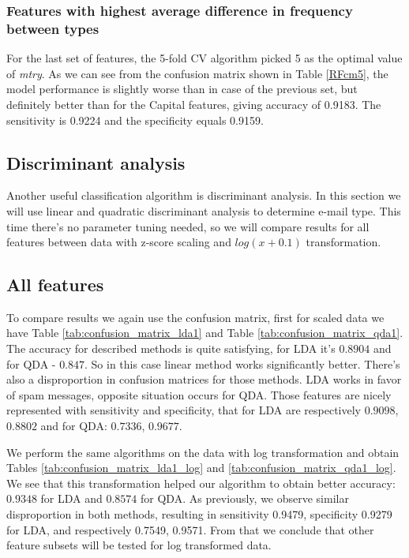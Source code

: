 \documentclass{article}\usepackage[]{graphicx}\usepackage[]{xcolor}
\begin{document}
\subsubsection*{Features with highest average difference in frequency between types}

For the last set of features, the 5-fold CV algorithm picked 5 as the optimal
value of \textit{mtry}. As we can see from the confusion matrix shown in Table \ref{RFcm5},
the model performance is slightly worse than in case of
the previous set, but definitely better than for the Capital features,
giving accuracy of 0.9183. The sensitivity is 0.9224 and the specificity equals 0.9159.

\subsection*{Discriminant analysis}
Another useful classification algorithm is discriminant analysis. In this section 
we will use linear and quadratic discriminant analysis to determine e-mail type. This time there's no parameter tuning needed, so we will compare results for all features between data with z-score scaling and $log(x+0.1)$ transformation.
	
\subsection*{All features}

To compare results we again use the confusion matrix, first for scaled data we have Table 
\ref{tab:confusion_matrix_lda1} and Table \ref{tab:confusion_matrix_qda1}.
The accuracy for described methods is quite satisfying, for LDA it's $0.8904$ 
and for QDA - $0.847$. So in this case linear method works significantly better. 
There's also a disproportion in confusion matrices for those methods. LDA works in favor 
of spam messages, opposite situation occurs for QDA. Those features are nicely represented with sensitivity 
and specificity, that for LDA are respectively $0.9098$, $0.8802$ and for QDA: $0.7336$, $0.9677$. 

We perform the same algorithms on the data with log transformation and 
obtain Tables \ref{tab:confusion_matrix_lda1_log} and \ref{tab:confusion_matrix_qda1_log}.
We see that this transformation helped our algorithm to obtain better accuracy: 
$0.9348$ for LDA and $0.8574$ for QDA. As previously, we observe similar disproportion in
both methods, resulting in sensitivity 0.9479, specificity 0.9279 for LDA, and
respectively 0.7549, 0.9571. From that we conclude that other feature 
subsets will be tested for log transformed data.
\end{document}
